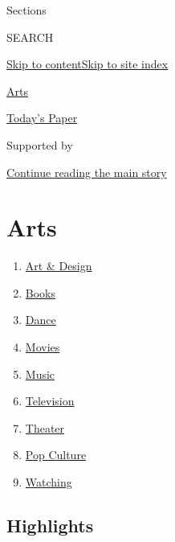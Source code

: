 Sections

SEARCH

\protect\hyperlink{site-content}{Skip to
content}\protect\hyperlink{site-index}{Skip to site index}

\href{https://www.nytimes3xbfgragh.onion/section/arts}{Arts}

\href{https://myaccount.nytimes3xbfgragh.onion/auth/login?response_type=cookie\&client_id=vi}{}

\href{https://www.nytimes3xbfgragh.onion/section/todayspaper}{Today's
Paper}

Supported by

\protect\hyperlink{after-sponsor}{Continue reading the main story}

\hypertarget{arts}{%
\section{Arts}\label{arts}}

\begin{enumerate}
\def\labelenumi{\arabic{enumi}.}
\tightlist
\item
  \href{/section/arts/design}{Art \& Design}
\item
  \href{/section/books}{Books}
\item
  \href{/section/arts/dance}{Dance}
\item
  \href{/section/movies}{Movies}
\item
  \href{/section/arts/music}{Music}
\item
  \href{/section/arts/television}{Television}
\item
  \href{/section/theater}{Theater}
\item
  \href{/spotlight/pop-culture}{Pop Culture}
\item
  \href{/watching}{Watching}
\end{enumerate}

\hypertarget{highlights}{%
\subsection{Highlights}\label{highlights}}

